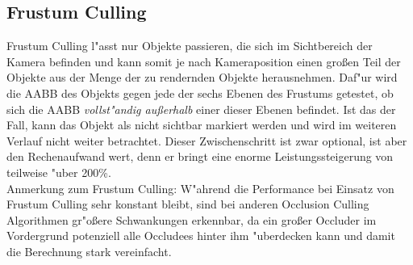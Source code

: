 \documentclass[journal]{vgtc}
\begin{document}
\subsection{Frustum Culling}
Frustum Culling l"asst nur Objekte passieren, die sich im Sichtbereich der Kamera befinden und kann somit je nach Kameraposition einen gro{\ss}en Teil der Objekte aus der Menge der zu rendernden Objekte herausnehmen.
Daf"ur wird die AABB des Objekts gegen jede der sechs Ebenen des Frustums getestet, ob sich die AABB \textit{vollst"andig au{\ss}erhalb} einer dieser Ebenen befindet.
Ist das der Fall, kann das Objekt als nicht sichtbar markiert werden und wird im weiteren Verlauf nicht weiter betrachtet. Dieser Zwischenschritt ist zwar optional, ist aber den Rechenaufwand wert, denn er bringt eine enorme Leistungssteigerung von teilweise "uber 200\%.\\
Anmerkung zum Frustum Culling: W"ahrend die Performance bei Einsatz von Frustum Culling sehr konstant bleibt, sind bei anderen Occlusion Culling Algorithmen gr"o\ss{}ere Schwankungen erkennbar, da ein gro\ss{}er Occluder im Vordergrund potenziell alle Occludees hinter ihm "uberdecken kann und damit die Berechnung stark vereinfacht.\\
\end{document}
